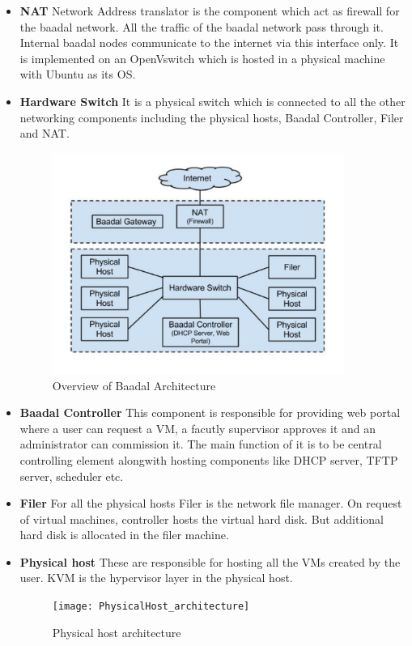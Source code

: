 \begin{itemize}
    \item \textbf{NAT} Network Address translator is the component which act as firewall for the baadal network. All the traffic of the baadal network pass through it. Internal baadal nodes communicate to the internet via this interface only. It is implemented on an OpenVswitch which is hosted in a physical machine with Ubuntu as its OS.
    \item \textbf{Hardware Switch} It is a physical switch which is connected to all the other networking components including the physical hosts, Baadal Controller, Filer and NAT.
    \begin{figure}[h]
\caption{Overview of Baadal Architecture}
\centering
\includegraphics[width=0.9\textwidth]{Baadal_architecture}
\end{figure}
    \item \textbf{Baadal Controller} This component is responsible for providing web portal where a user can request a VM, a facutly supervisor approves it and an administrator can commission it. The main function of it is to be central controlling element alongwith hosting components like DHCP server, TFTP server, scheduler etc.
    
    \item \textbf{Filer} For all the physical hosts Filer is the network file manager. On request of virtual machines, controller hosts the virtual hard disk. But additional hard disk is allocated in the filer machine.
    
    \item \textbf{Physical host} These are responsible for hosting all the VMs created by the user. KVM is the hypervisor layer in the physical host.
    
\begin{figure}[h]
\caption{Physical host architecture}
\centering
\texttt{[image: PhysicalHost\_architecture]}
\end{figure}
\end{itemize}

